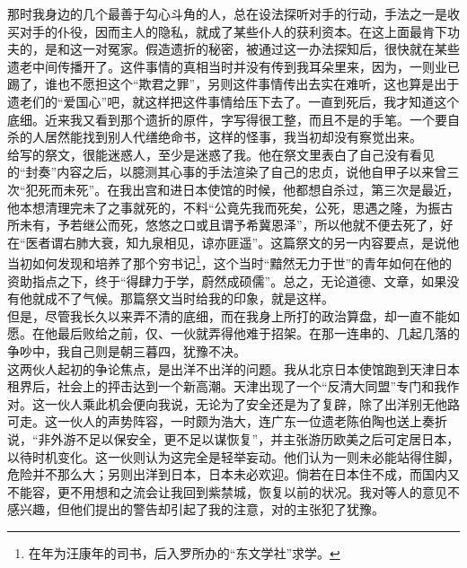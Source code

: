 那时我身边的几个最善于勾心斗角的人，总在设法探听对手的行动，手法之一是收买对手的仆役，因而主人的隐私，就成了某些仆人的获利资本。在这上面最肯下功夫的，是和这一对冤家。假造遗折的秘密，被通过这一办法探知后，很快就在某些遗老中间传播开了。这件事情的真相当时并没有传到我耳朵里来，因为，一则业已踢了，谁也不愿担这个“欺君之罪”，另则这件事情传出去实在难听，这也算是出于遗老们的“爱国心”吧，就这样把这件事情给压下去了。一直到死后，我才知道这个底细。近来我又看到那个遗折的原件，字写得很工整，而且不是的手笔。一个要自杀的人居然能找到别人代缮绝命书，这样的怪事，我当初却没有察觉出来。\\

给写的祭文，很能迷惑人，至少是迷惑了我。他在祭文里表白了自己没有看见的“封奏”内容之后，以臆测其心事的手法渲染了自己的忠贞，说他自甲子以来曾三次“犯死而未死”。在我出宫和进日本使馆的时候，他都想自杀过，第三次是最近，他本想清理完未了之事就死的，不料“公竟先我而死矣，公死，思遇之隆，为振古所未有，予若继公而死，悠悠之口或且谓予希冀恩泽”，所以他就不便去死了，好在“医者谓右肺大衰，知九泉相见，谅亦匪遥”。这篇祭文的另一内容要点，是说他当初如何发现和培养了那个穷书记\footnote{在年为汪康年的司书，后入罗所办的“东文学社”求学。}，这个当时“黯然无力于世”的青年如何在他的资助指点之下，终于“得肆力于学，蔚然成硕儒”。总之，无论道德、文章，如果没有他就成不了气候。那篇祭文当时给我的印象，就是这样。\\

但是，尽管我长久以来弄不清的底细，而在我身上所打的政治算盘，却一直不能如愿。在他最后败给之前，仅、一伙就弄得他难于招架。在那一连串的、几起几落的争吵中，我自己则是朝三暮四，犹豫不决。\\

这两伙人起初的争论焦点，是出洋不出洋的问题。我从北京日本使馆跑到天津日本租界后，社会上的抨击达到一个新高潮。天津出现了一个“反清大同盟”专门和我作对。这一伙人乘此机会便向我说，无论为了安全还是为了复辟，除了出洋别无他路可走。这一伙人的声势阵容，一时颇为浩大，连广东一位遗老陈伯陶也送上奏折说，“非外游不足以保安全，更不足以谋恢复”，并主张游历欧美之后可定居日本，以待时机变化。这一伙则认为这完全是轻举妄动。他们认为一则未必能站得住脚，危险并不那么大；另则出洋到日本，日本未必欢迎。倘若在日本住不成，而国内又不能容，更不用想和之流会让我回到紫禁城，恢复以前的状况。我对等人的意见不感兴趣，但他们提出的警告却引起了我的注意，对的主张犯了犹豫。\\

